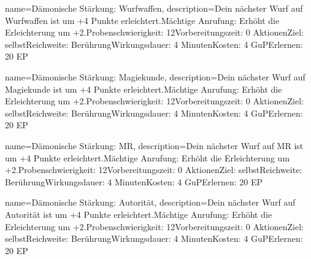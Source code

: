 {
    name={Dämonische Stärkung: Wurfwaffen},
    description={Dein nächster Wurf auf Wurfwaffen ist um +4 Punkte erleichtert.\newline Mächtige Anrufung: Erhöht die Erleichterung um +2.\newline Probenschwierigkeit: 12\newline Vorbereitungszeit: 0 Aktionen\newline Ziel: selbst\newline Reichweite: Berührung\newline Wirkungsdauer: 4 Minuten\newline Kosten: 4 GuP\newline Erlernen: 20 EP}
}


{
    name={Dämonische Stärkung: Magiekunde},
    description={Dein nächster Wurf auf Magiekunde ist um +4 Punkte erleichtert.\newline Mächtige Anrufung: Erhöht die Erleichterung um +2.\newline Probenschwierigkeit: 12\newline Vorbereitungszeit: 0 Aktionen\newline Ziel: selbst\newline Reichweite: Berührung\newline Wirkungsdauer: 4 Minuten\newline Kosten: 4 GuP\newline Erlernen: 20 EP}
}


{
    name={Dämonische Stärkung: MR},
    description={Dein nächster Wurf auf MR ist um +4 Punkte erleichtert.\newline Mächtige Anrufung: Erhöht die Erleichterung um +2.\newline Probenschwierigkeit: 12\newline Vorbereitungszeit: 0 Aktionen\newline Ziel: selbst\newline Reichweite: Berührung\newline Wirkungsdauer: 4 Minuten\newline Kosten: 4 GuP\newline Erlernen: 20 EP}
}


{
    name={Dämonische Stärkung: Autorität},
    description={Dein nächster Wurf auf Autorität ist um +4 Punkte erleichtert.\newline Mächtige Anrufung: Erhöht die Erleichterung um +2.\newline Probenschwierigkeit: 12\newline Vorbereitungszeit: 0 Aktionen\newline Ziel: selbst\newline Reichweite: Berührung\newline Wirkungsdauer: 4 Minuten\newline Kosten: 4 GuP\newline Erlernen: 20 EP}
}


